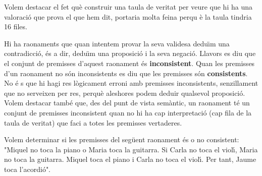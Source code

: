 \begin{solucio}
Volem destacar el fet qu\`{e} construir una taula de veritat per veure que
hi ha una valoraci\'{o} que prova el que hem dit, portaria molta feina perqu%
\`{e} la taula tindria 16 files.
\end{solucio}

\bigskip

Hi ha raonaments que quan intentem provar la seva validesa dedu\"{\i}m una
contradicci\'{o}, \'{e}s a dir, dedu\"{\i}m una proposici\'{o} i la seva
negaci\'{o}. Llavors es diu que el conjunt de premisses d'aquest raonament
\'{e}s \textbf{inconsistent}. Quan les premisses d'un raonament no s\'{o}n
inconsistents es diu que les premisses s\'{o}n \textbf{consistents}. No \'{e}%
s que hi hagi res l\`{o}gicament erroni amb premisses inconsistents,
senzillament que no serveixen per res, perqu\`{e} aleshores podem deduir
qualsevol proposici\'{o}. Volem destacar tamb\'{e} que, des del punt de
vista sem\`{a}ntic, un raonament t\'{e} un conjunt de premisses inconsistent
quan no hi ha cap interpretaci\'{o} (cap fila de la taula de veritat) que
faci a totes les premisses vertaderes.

\begin{exemple}
Volem determinar si les premisses del seg\"{u}ent raonament \'{e}s o no
consistent: "Miquel no toca la piano o Maria toca la guitarra. Si Carla no
toca el viol\'{\i}, Maria no toca la guitarra. Miquel toca el piano i Carla
no toca el viol\'{\i}. Per tant, Jaume toca l'acordi\'{o}".
\end{exemple}

